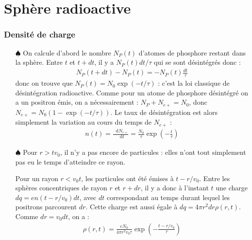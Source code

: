 \documentclass{report}
\newcommand*\dif{\mathop{}\!\mathrm{d}}
\begin{document}
\section*{Sphère radioactive}

\subsubsection*{Densité de charge}

\begin{itemize}

	\item[$\spadesuit$] On calcule d'abord le nombre $N_P(t)$ d'atomes de phosphore restant dans la sphère. Entre $t$ et $t+dt$, il y a $N_P(t)dt/\tau$ qui se sont désintégrés donc :
	\begin{align*}
		N_P(t+dt)-N_P(t)=-N_P(t)\frac{dt}{\tau}
	\end{align*}
	donc on trouve que $N_P(t)=N_0\exp(-t/\tau)$ : c'est la loi classique de désintégration radioactive. Comme pour un atome de phosphore désintégré on a un positron émis, on a nécessairement : $N_P+N_{e+}=N_0$, donc $N_{e+}=N_0(1-\exp(-t/\tau))$. Le taux de désintégration est alors simplement la variation au cours du temps de $N_{e+}$ :
	\begin{align*}
		n(t)=\frac{\dif N_{e+}}{\dif t}=\frac{N_0}{\tau}\exp\left(-\frac{t}{\tau} \right) 
	\end{align*}
	
	\item[$\spadesuit$] Pour $r>tv_0$, il n'y a pas encore de particules : elles n'ont tout simplement pas eu le temps d'atteindre ce rayon.
	
		Pour un rayon $r<v_0t$, les particules ont été émises à $t-r/v_0$. Entre les sphères concentriques de rayon $r$ et $r+dr$, il y a donc à l'instant $t$ une charge $dq=en(t-r/v_0)dt$, avec $dt$ correspondant au temps durant lequel les positrons parcourent $dr$. Cette charge est aussi égale à $dq=4\pi r^2dr\rho(r,t)$. Comme $dr=v_0dt$, on a :
	\begin{align*}
		\rho(r,t)=\frac{eN_0}{4\pi r^2v_0\tau}\exp\left(-\frac{t-r/v_0}{\tau} \right) 
	\end{align*}

\end{itemize}
\end{document}
